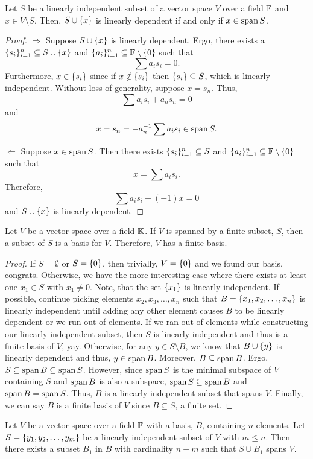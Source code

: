 \begin{thm}
	Let $S$ be a linearly independent subset of a vector space $V$ over a field $\mathbb{F}$ and $x\in V\setminus S$.
	Then, $S\cup\lbrace x \rbrace$ is linearly dependent if and only if $x\in\operatorname{span} S$.
\end{thm}
\begin{proof}
	$\Rightarrow$ Suppose $S\cup\lbrace x \rbrace$ is linearly dependent.
	Ergo, there exists a $\lbrace s_i \rbrace_{i=1}^n\subseteq S\cup\lbrace x \rbrace$ and $\lbrace a_i \rbrace_{i=1}^n\subseteq\mathbb{F}\setminus\lbrace 0 \rbrace$ such that
	\[
		\sum a_is_i=0.
	\]
	Furthermore, $x\in\lbrace s_i \rbrace$ since if $x\notin\lbrace s_i \rbrace$ then $\lbrace s_i \rbrace\subseteq S$, which is linearly independent.
	Without loss of generality, suppose $x=s_n$.
	Thus,
	\[
		\sum a_is_i +a_ns_n=0
	\]
	and
	\[
		x=s_n=-a_n^{-1}\sum a_is_i\in\operatorname{span} S.
	\]

	$\Leftarrow$ Suppose $x\in\operatorname{span} S$.
	Then there exists $\lbrace s_i \rbrace_{i=1}^n\subseteq S$ and $\lbrace a_i \rbrace_{i=1}^n\subseteq\mathbb{F}\setminus\lbrace 0 \rbrace$ such that
	\[
		x = \sum a_i s_i.
	\]
	Therefore,
	\[
		\sum a_i s_i + (-1)x=0
	\]
	and $S\cup\lbrace x \rbrace$ is linearly dependent.
\end{proof}

\begin{thm}
	Let $V$ be a vector space over a field $\mathbb{K}$.
	If $V$ is spanned by a finite subset, $S$, then a subset of $S$ is a basis for $V$.
	Therefore, $V$ has a finite basis.
\end{thm}
\begin{proof}
	If $S=\emptyset$ or $S=\lbrace 0 \rbrace$. then trivially, $V=\lbrace 0 \rbrace$ and we found our basis, congrats.
	Otherwise, we have the more interesting case where there exists at least one $x_1\in S$ with $x_1\neq0$.
	Note, that the set $\lbrace x_1 \rbrace$ is linearly independent.
	If possible, continue picking elements $x_2,x_3,\ldots,x_n$ such that $B=\lbrace x_1,x_2,\ldots,x_n \rbrace$ is linearly independent until adding any other element causes $B$ to be linearly dependent or we run out of elements.
	If we ran out of elements while constructing our linearly independent subset, then $S$ is linearly independent and thus is a finite basis of $V$, yay.
	Otherwise, for any $y\in S\setminus B$, we know that $B\cup\lbrace y \rbrace$ is linearly dependent and thus, $y\in\operatorname{span} B$.
	Moreover, $B\subseteq\operatorname{span} B$.
	Ergo, $S\subseteq \operatorname{span} B\subseteq\operatorname{span} S$.
	However, since $\operatorname{span} S$ is the minimal subspace of $V$ containing $S$ and $\operatorname{span} B$ is also a subspace, $\operatorname{span} S\subseteq\operatorname{span} B$ and $\operatorname{span} B=\operatorname{span} S$.
	Thus, $B$ is a linearly independent subset that spans $V$.
	Finally, we can say $B$ is a finite basis of $V$ since $B\subseteq S$, a finite set.
\end{proof}

\begin{thm}
	Let $V$ be a vector space over a field $\mathbb{F}$ with a basis, $B$, containing $n$ elements.
	Let $S=\lbrace y_1,y_2,\ldots,y_m \rbrace$ be a linearly independent subset of $V$ with $m\leq n$.
	Then there exists a subset $B_1$ in $B$ with cardinality $n-m$ such that $S\cup B_1$ spans $V$.
\end{thm}

